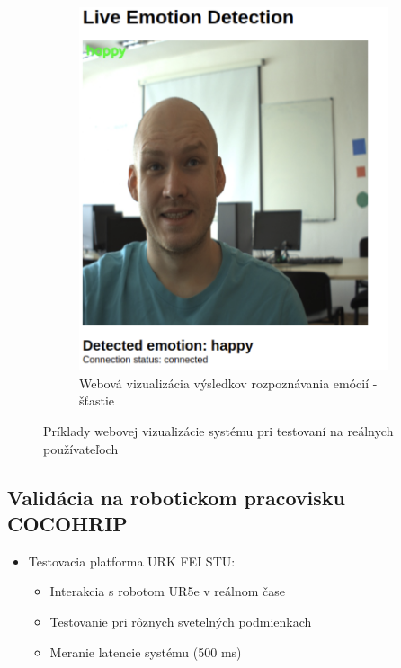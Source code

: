 \begin{figure}[!htpb]
\begin{subfigure}{0.48\textwidth}
        \includegraphics[width=\textwidth]{img/web_2.png}
        \caption{Webová vizualizácia výsledkov rozpoznávania emócií - šťastie}
    \end{subfigure}
    \caption{Príklady webovej vizualizácie systému pri testovaní na reálnych používateľoch}
    \label{fig:web_examples}
\end{figure}

\subsection{Validácia na robotickom pracovisku COCOHRIP}
    \begin{itemize}
\item Testovacia platforma URK FEI STU:
  \begin{itemize}
  \item Interakcia s robotom UR5e v reálnom čase
  \item Testovanie pri rôznych svetelných podmienkach
  \item Meranie latencie systému (500 ms)
  \end{itemize}
\end{itemize}

